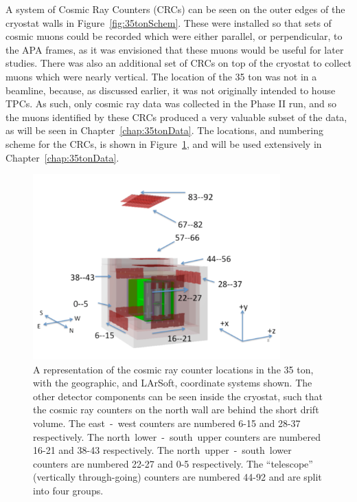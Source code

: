 A system of Cosmic Ray Counters (CRCs) can be seen on the outer edges of the cryostat walls in Figure~\ref{fig:35tonSchem}. These were installed so that sets of cosmic muons could be recorded which were either parallel, or perpendicular, to the APA frames, as it was envisioned that these muons would be useful for later studies. There was also an additional set of CRCs on top of the cryostat to collect muons which were nearly vertical. The location of the 35 ton was not in a beamline, because, as discussed earlier, it was not originally intended to house TPCs. As such, only cosmic ray data was collected in the Phase II run, and so the muons identified by these CRCs produced a very valuable subset of the data, as will be seen in Chapter~\ref{chap:35tonData}. The locations, and numbering scheme for the CRCs, is shown in Figure~\ref{fig:35tonCounterLoc}, and will be used extensively in Chapter~\ref{chap:35tonData}. \\

\begin{figure}
  \centering
  \includegraphics[width=0.85\textwidth]{35tonFullDetect}
  \caption[A representation of the cosmic ray counter locations in the 35 ton]
          {A representation of the cosmic ray counter locations in the 35 ton, with the geographic, and LArSoft, coordinate systems shown. The other detector components can be seen inside the cryostat, such that the cosmic ray counters on the north wall are behind the short drift volume. The east~-~west counters are numbered 6-15 and 28-37 respectively. The north~lower~-~south~upper counters are numbered 16-21 and 38-43 respectively. The north~upper~-~south~lower counters are numbered 22-27 and 0-5 respectively. The ``telescope'' (vertically through-going) counters are numbered 44-92 and are split into four groups.}
  \label{fig:35tonCounterLoc}
\end{figure}

